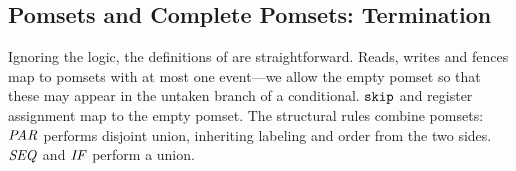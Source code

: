 




\subsection{Pomsets and Complete Pomsets: Termination}
\label{sec:ex:pomset}
\label{sec:ex:term}


Ignoring the logic, the definitions of  are straightforward.
Reads, writes and fences map to pomsets with at most one event---we allow the
empty pomset so that these may appear in the untaken branch of a conditional.
$\texttt{skip}$ and register assignment map to the empty pomset.  
The structural rules combine pomsets: $\sPAR{}{}$ performs disjoint union,
inheriting labeling and order from the two sides.  $\sSEMI{}{}$ and $\sIF{}$
perform a union.

